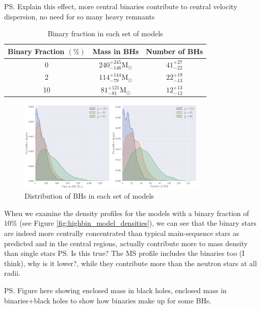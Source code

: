 \ps{Explain this effect, more central binaries contribute to central velocity dispersion, no need
	for so many heavy remnants}

\begin{table}
	\centering
	\caption{Binary fraction in each set of models}
	\begin{tabular}{c c c}
		\hline
		Binary Fraction $(\%)$ & Mass in BHs                          & Number of BHs    \\
		\hline
		0                      & $240^{+245}_{-146} \mathrm{M}_\odot$ & $41^{+27}_{-22}$ \\
		2                      & $114^{+144}_{-79} \mathrm{M}_\odot$  & $22^{+19}_{-13}$ \\
		10                     & $81 ^{+121}_{-81} \mathrm{M}_\odot$  & $12^{+13}_{-12}$ \\
		\hline
	\end{tabular}
	\label{tab:BH_contents}
\end{table}


\begin{figure}
	\centering
	\includegraphics[width=0.8\textwidth]{figures/BH_KDEs.png}
	\caption{Distribution of BHs in each set of models}
	\label{fig:BH_KDEs}
\end{figure}

When we examine the density profiles for the models with a binary fraction of $10\%$ (see Figure
\ref{fig:highbin_model_densities}), we can see that the binary stars are indeed more centrally
concentrated than typical main-sequence stars as predicted and in the central regions, actually
contribute more to mass density than single stars \ps{Is this true? The MS profile includes the
	binaries too (I think), why is it lower?}, while they contribute more than the neutron stars at all
radii.

\ps{Figure here showing enclosed mass in black holes, enclosed mass in binaries+black holes to show
	how binaries make up for some BHs.}


